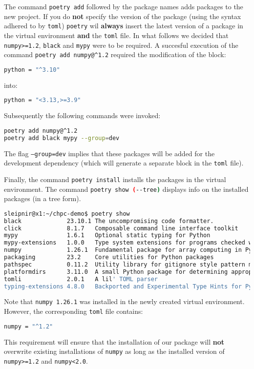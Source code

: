\documentclass[10pt]{article}
\begin{document}
The command \lstinline[language=bash]{poetry add} followed by the package names adds packages to the new project. 
If you do \textbf{not} specify the version of the package (using the syntax adhered to by \texttt{toml}) 
\lstinline[language=bash]{poetry} wil \textbf{always} insert 
the latest version of a package in the virtual environment \textbf{and} the \texttt{toml} file. 
In what follows we decided that \texttt{numpy>=1.2}, \texttt{black} and \texttt{mypy} were to be required.
A succesful execution of the command \texttt{poetry add numpy@\textasciicircum1.2} required the modification of the block:
\begin{lstlisting}[language=bash]
python = "^3.10"
\end{lstlisting}
into:
\begin{lstlisting}[language=bash]
python = "<3.13,>=3.9"
\end{lstlisting}
Subsequently the following commands were invoked:
\begin{lstlisting}[language=bash]
poetry add numpy@^1.2
poetry add black mypy --group=dev
\end{lstlisting}
The flag \texttt{--group=dev} implies that these packages will be added for the development dependency 
(which will generate a separate block in the \texttt{toml} file).

Finally, the command \lstinline[language=bash]{poetry install} installs the packages in the virtual environment. 
The command \lstinline[language=bash]{poetry show (--tree)} displays info on the installed packages (in a tree form).

\begin{lstlisting}[language=bash]
sleipnir@x1:~/chpc-demo$ poetry show
black             23.10.1 The uncompromising code formatter.
click             8.1.7   Composable command line interface toolkit
mypy              1.6.1   Optional static typing for Python
mypy-extensions   1.0.0   Type system extensions for programs checked with the mypy type checker.
numpy             1.26.1  Fundamental package for array computing in Python
packaging         23.2    Core utilities for Python packages
pathspec          0.11.2  Utility library for gitignore style pattern matching of file paths.
platformdirs      3.11.0  A small Python package for determining appropriate platform-specific dirs, e.g. a "user data dir".
tomli             2.0.1   A lil' TOML parser
typing-extensions 4.8.0   Backported and Experimental Type Hints for Python 3.8+
\end{lstlisting}
Note that \texttt{numpy 1.26.1} was installed in the newly created virtual environment. 
However, the corresponding \texttt{toml} file contains:
\begin{lstlisting}[language=bash]
numpy = "^1.2"
\end{lstlisting}
This requirement will ensure that the installation of our package will \textbf{not} overwrite existing 
installations of \texttt{numpy} as long as the installed version of \texttt{numpy>=1.2} and \texttt{numpy<2.0}.
\end{document}
